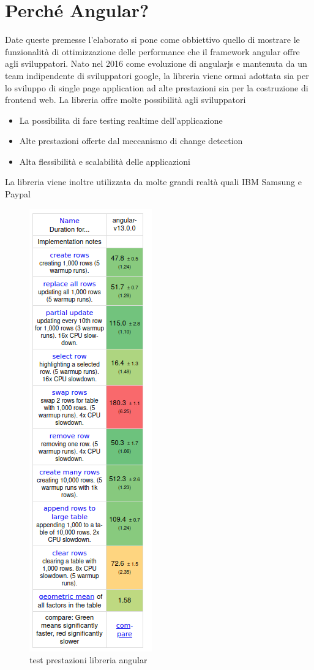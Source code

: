    \section{Perché Angular?}
Date queste premesse l'elaborato si pone come obbiettivo quello di mostrare le funzionalità di ottimizzazione delle performance che il framework angular offre agli sviluppatori.
\newline
Nato nel 2016 come evoluzione di angularjs e mantenuta da un team indipendente di sviluppatori google, la libreria viene ormai adottata sia per lo sviluppo di single page application ad alte prestazioni sia per la costruzione di frontend web.
\newline
La libreria offre molte possibilità agli sviluppatori
\begin{itemize}
    \item La possibilita di fare testing realtime dell'applicazione
    \item Alte prestazioni offerte dal meccanismo di change detection
    \item Alta flessibilità e scalabilità delle applicazioni
\end{itemize}
La libreria viene inoltre utilizzata da molte grandi realtà quali IBM Samsung e Paypal
\newline
\begin{figure}[H]
   \centering
   \includegraphics[scale=0.4]{resources/angular-performance.png}
\caption{test prestazioni libreria angular}
\end{figure}
